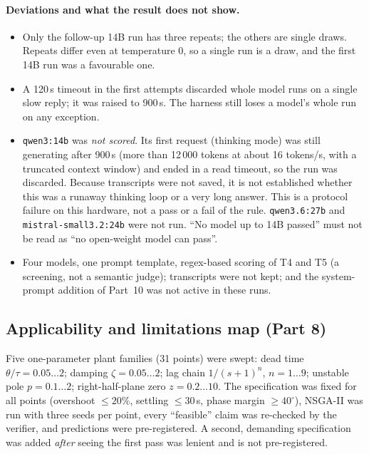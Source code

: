 \documentclass[a4paper,11pt]{article}
\begin{document}
\paragraph{Deviations and what the result does not show.}
\begin{itemize}[nosep]
\item Only the follow-up 14B run has three repeats; the others are single draws. Repeats differ even at temperature 0, so a single run is a draw, and the first 14B run was a favourable one.
\item A 120\,s timeout in the first attempts discarded whole model runs on a single slow reply; it was raised to 900\,s. The harness still loses a model's whole run on any exception.
\item \texttt{qwen3:14b} was \emph{not scored}. Its first request (thinking mode) was still generating after 900\,s (more than 12\,000 tokens at about 16 tokens/s, with a truncated context window) and ended in a read timeout, so the run was discarded. Because transcripts were not saved, it is not established whether this was a runaway thinking loop or a very long answer. This is a protocol failure on this hardware, not a pass or a fail of the rule. \texttt{qwen3.6:27b} and \texttt{mistral-small3.2:24b} were not run. ``No model up to 14B passed'' must not be read as ``no open-weight model can pass''.
\item Four models, one prompt template, regex-based scoring of T4 and T5 (a screening, not a semantic judge); transcripts were not kept; and the system-prompt addition of Part~10 was not active in these runs.
\end{itemize}

\subsection{Applicability and limitations map (Part 8)}
Five one-parameter plant families (31 points) were swept: dead time $\theta/\tau=0.05\dots2$; damping $\zeta=0.05\dots2$; lag chain $1/(s+1)^n$, $n=1\dots9$; unstable pole $p=0.1\dots2$; right-half-plane zero $z=0.2\dots10$. The specification was fixed for all points (overshoot $\le20\%$, settling $\le30$\,s, phase margin $\ge40^\circ$), NSGA-II was run with three seeds per point, every ``feasible'' claim was re-checked by the verifier, and predictions were pre-registered. A second, demanding specification was added \emph{after} seeing the first pass was lenient and is not pre-registered.
\end{document}
